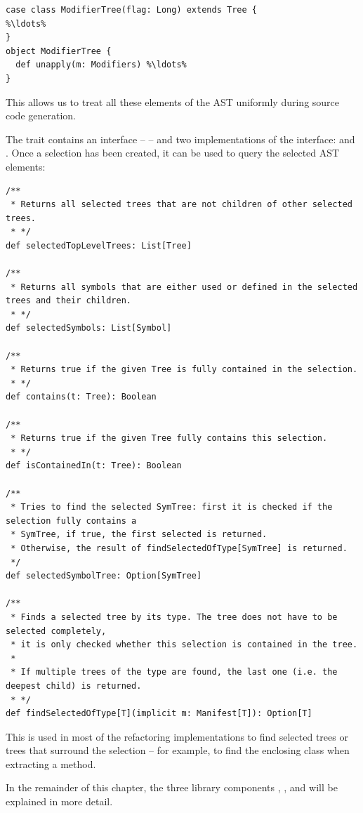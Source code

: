 \begin{lstlisting}
case class ModifierTree(flag: Long) extends Tree {
%\ldots%
}
object ModifierTree {
  def unapply(m: Modifiers) %\ldots%
}
\end{lstlisting}

This allows us to treat all these elements of the AST uniformly during source code generation.

The  trait contains an interface --  -- and two implementations of the interface:  and . Once a selection has been created, it can be used to query the selected AST elements:

\begin{lstlisting}
/**
 * Returns all selected trees that are not children of other selected trees.
 * */
def selectedTopLevelTrees: List[Tree]
    
/**
 * Returns all symbols that are either used or defined in the selected trees and their children.
 * */
def selectedSymbols: List[Symbol]

/**
 * Returns true if the given Tree is fully contained in the selection.
 * */
def contains(t: Tree): Boolean

/**
 * Returns true if the given Tree fully contains this selection.
 * */
def isContainedIn(t: Tree): Boolean

/**
 * Tries to find the selected SymTree: first it is checked if the selection fully contains a
 * SymTree, if true, the first selected is returned. 
 * Otherwise, the result of findSelectedOfType[SymTree] is returned.
 */
def selectedSymbolTree: Option[SymTree]

/**
 * Finds a selected tree by its type. The tree does not have to be selected completely,
 * it is only checked whether this selection is contained in the tree.
 * 
 * If multiple trees of the type are found, the last one (i.e. the deepest child) is returned.
 * */
def findSelectedOfType[T](implicit m: Manifest[T]): Option[T]
\end{lstlisting}

This is used in most of the refactoring implementations to find selected trees or trees that surround the selection -- for example, to find the enclosing class when extracting a method.

In the remainder of this chapter, the three library components , , and  will be explained in more detail. 

